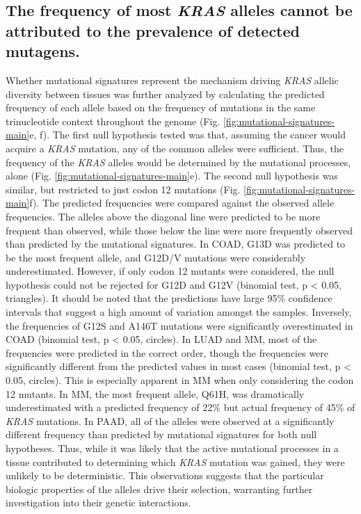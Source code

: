 \documentclass[english, 10pt, letterpaper]{article}
\newcommand{\KRAS}{\emph{KRAS}}
\begin{document}
\subsection*{The frequency of most \KRAS{} alleles cannot be attributed to the prevalence of detected mutagens.}

Whether mutational signatures represent the mechanism driving \KRAS{} allelic diversity between tissues was further analyzed by calculating the predicted frequency of each allele based on the frequency of mutations in the same trinucleotide context throughout the genome (Fig. \ref{fig:mutational-signatures-main}e, f).
The first null hypothesis tested was that, assuming the cancer would acquire a \KRAS{} mutation, any of the common alleles were sufficient.
Thus, the frequency of the \KRAS{} alleles would be determined by the mutational processes, alone (Fig. \ref{fig:mutational-signatures-main}e).
The second null hypothesis was similar, but restricted to just codon 12 mutations (Fig. \ref{fig:mutational-signatures-main}f).
The predicted frequencies were compared against the observed allele frequencies.
The alleles above the diagonal line were predicted to be more frequent than observed, while those below the line were more frequently observed than predicted by the mutational signatures.
In COAD, G13D was predicted to be the most frequent allele, and G12D/V mutations were considerably underestimated.
However, if only codon 12 mutants were considered, the null hypothesis could not be rejected for G12D and G12V  (binomial test, p < 0.05, triangles).
It should be noted that the predictions have large 95\% confidence intervals that suggest a high amount of variation amongst the samples.
Inversely, the frequencies of G12S and A146T mutations were significantly overestimated in COAD (binomial test, p < 0.05, circles).
In LUAD and MM, most of the frequencies were predicted in the correct order, though the frequencies were significantly different from the predicted values in most cases (binomial test, p < 0.05, circles).
This is especially apparent in MM when only considering the codon 12 mutants.
In MM, the most frequent allele, Q61H, was dramatically underestimated with a predicted frequency of 22\% but actual frequency of 45\% of \KRAS{} mutations.
In PAAD, all of the alleles were observed at a significantly different frequency than predicted by mutational signatures for both null hypotheses.
Thus, while it was likely that the active mutational processes in a tissue contributed to determining which \KRAS{} mutation was gained, they were unlikely to be deterministic.
This observations suggests that the particular biologic properties of the alleles drive their selection, warranting further investigation into their genetic interactions.
\end{document}
